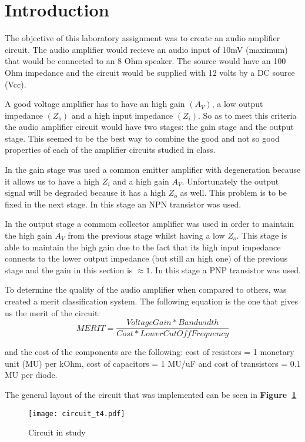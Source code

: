 \section{Introduction}
\label{sec:introduction}


\par The objective of this laboratory assignment was to create an audio amplifier circuit. The audio amplifier would recieve an audio input of 10mV (maximum) that would be connected to an 8 Ohm speaker. The source would have an 100 Ohm impedance and the circuit would be supplied with 12 volts by a DC source (Vcc).
\par A good voltage amplifier has to have an high gain $(A_{V})$, a low output impedance $(Z_{o})$ and a high input impedance $(Z_{i})$. So as to meet this criteria the audio amplifier circuit would have two stages: the gain stage and the output stage. This seemed to be the best way to combine the good and not so good properties of each of the amplifier circuits studied in class.\par
 In the gain stage was used a common emitter amplifier with degeneration because it allows us to have a high $Z_{i}$ and a high gain $A_{V}$. Unfortunately the output signal will be degraded because it has a high $Z_{o}$ as well. This problem is to be fixed in the next stage. In this stage an NPN transistor was used.\par
 In the output stage a commom collector amplifier was used in order to maintain the high gain $A_{V}$ from the previous stage whilst having a low $Z_{o}$. This stage is able to maintain the high gain due to the fact that its high input impedance connects to the lower output impedance (but still an high one) of the previous stage and the gain in this section is $\approx 1$. In this stage a PNP transistor was used.
\par   
To determine the quality of the audio amplifier when compared to others, was created a merit classification system. The following equation is the one that gives us the merit of the circuit: 
\begin {equation}
	 MERIT = \frac{Voltage Gain*Bandwidth}{Cost*Lower Cut Off Frequency}   	
	\label{eq:i1}
\end{equation}

and the cost of the components are the following: cost of resistors = 1 monetary unit (MU) per kOhm, cost of capacitors = 1 MU/uF
and cost of transistors = 0.1 MU per diode. 

The general layout of the circuit that was implemented can be seen in \textbf{Figure~\ref{fig:circuit_t4}}
\par
\begin{figure}[h] \centering
\texttt{[image: circuit\_t4.pdf]}
\vspace{-6cm}
\caption{Circuit in study}
\label{fig:circuit_t4}
\end{figure}


